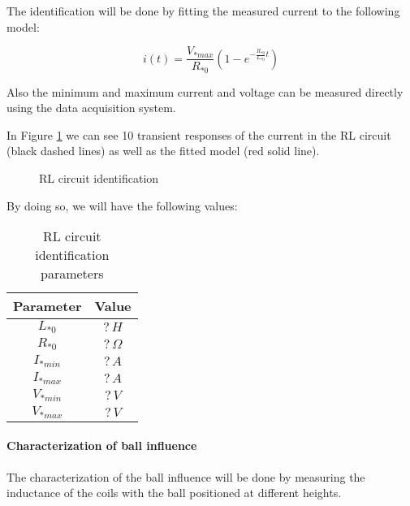 The identification will be done by fitting the measured current to the following model:

\begin{equation}
    i(t) = \frac{V_{*max}}{R_{*0}} \left(1 - e^{-\frac{R_{*0}}{L_{*0}}t}\right)
\end{equation}

Also the minimum and maximum current and voltage can be measured directly using the data acquisition system.

In Figure \ref{fig:RL_circuit_identification} we can see 10 transient responses of the current in the RL circuit (black dashed lines) as well as the fitted model (red solid line).

\begin{figure}[H]
    \centering
    \caption{RL circuit identification}
    \label{fig:RL_circuit_identification}
\end{figure}

By doing so, we will have the following values:

\begin{table}[H]

    \centering
    \begin{tabular}{|c|c|}
        \hline
        \textbf{Parameter} & \textbf{Value} \\
        \hline
        $L_{*0}$           & $? \, H$       \\
        $R_{*0}$           & $? \, \Omega$  \\
        $I_{*min}$         & $? \, A$       \\
        $I_{*max}$         & $? \, A$       \\
        $V_{*min}$         & $? \, V$       \\
        $V_{*max}$         & $? \, V$       \\
        \hline
    \end{tabular}

    \caption{RL circuit identification parameters}
    \label{tab:RL_circuit_identification_parameters}

\end{table}

\paragraph{Characterization of ball influence}

The characterization of the ball influence will be done by measuring the inductance of the coils with the ball positioned at different heights.

